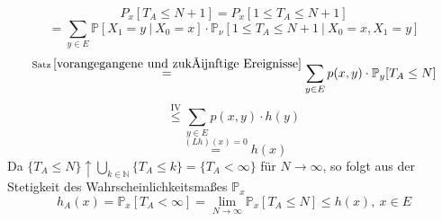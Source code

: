 \begin{equation*}
P_{x}[T_{A} \leq N+1] = P_{x}[1 \leq T_{A} \leq N+1]
\end{equation*}
\begin{equation*}
= \sum_{y \in E} \mathbb{P}[X_{1} = y \: | \: X_{0} = x] \cdot \mathbb{P}_{\nu}[1 \leq T_{A} \leq N+1 \: | \: X_{0} = x, X_{1} = y]
\end{equation*}
\begin{equation*}
\stackrel{\mathrm{Satz} \: \ref{vorangegangene und zukünftige Ereignisse}}{=} \sum_{y \in E} p(x,y) \cdot \mathbb{P}_{y}[T_{A} \leq N]
\end{equation*}
\begin{equation*}
\stackrel{\mathrm{IV}}{\leq}\sum_{y \in E} p(x,y) \cdot h(y)
\end{equation*}
\begin{equation*}
\stackrel{(Lh)(x) = 0}{=}h(x)
\end{equation*}
Da $\lbrace T_{A} \leq N \rbrace \uparrow \bigcup_{k \in \mathbb{N}} \lbrace T_{A} \leq k \rbrace = \lbrace T_{A} < \infty \rbrace$ für $N \to \infty$, so folgt aus der Stetigkeit des Wahrscheinlichkeitsmaßes $\mathbb{P}_{x}$
\begin{equation*}
h_{A}(x) = \mathbb{P}_{x}[T_{A} < \infty] = \lim_{N \to \infty} \mathbb{P}_{x}[T_{A} \leq N] \leq h(x), \: x \in E
\end{equation*}

